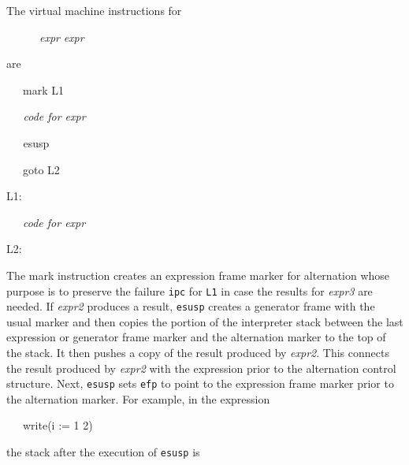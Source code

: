 The virtual machine instructions for

{\ttfamily\mdseries
\ \ \ \ \ \ \textit{expr} {\textbar} \textit{expr}}

are

{\ttfamily\mdseries
\ \ \ mark L1}

{\ttfamily\itshape
\ \ \ code for expr}


\textit{\ \ \ }esusp

{\ttfamily\mdseries
\ \ \ goto L2}

{\ttfamily\mdseries
L1:}

{\ttfamily\mdseries
\ \ \ \textit{code for expr}\textit{}}

{\ttfamily\mdseries
L2:}


The mark instruction creates an expression frame marker for
alternation whose purpose is to preserve the failure \texttt{ipc} for
\texttt{L1} in case the results for \textit{expr3 }are needed. If
\textit{expr2 }produces a result, \texttt{esusp} creates a generator
frame with the usual marker and then copies the portion of the
interpreter stack between the last expression or generator frame
marker and the alternation marker to the top of the stack. It then
pushes a copy of the result produced by \textit{expr2}. This connects
the result produced by \textit{expr2 }with the expression prior to the
alternation control structure. Next, \texttt{esusp} sets \texttt{efp}
to point to the expression frame marker prior to the alternation
marker. For example, in the expression

{\ttfamily\mdseries
\ \ \ write(i := 1 {\textbar} 2)}

\noindent the stack after the execution of \texttt{esusp} is


